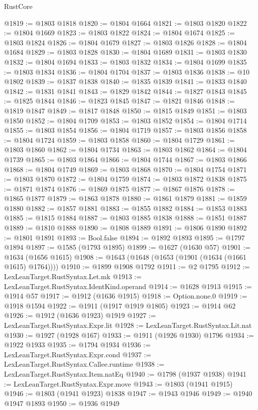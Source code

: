 \begin{lexlean}{RustCore}
\begin{coremodule}
@1819 := @1803 @1818
@1820 := @1804 @1664
@1821 := @1803 @1820
@1822 := @1804 @1669
@1823 := @1803 @1822
@1824 := @1804 @1674
@1825 := @1803 @1824
@1826 := @1804 @1679
@1827 := @1803 @1826
@1828 := @1804 @1684
@1829 := @1803 @1828
@1830 := @1804 @1689
@1831 := @1803 @1830
@1832 := @1804 @1694
@1833 := @1803 @1832
@1834 := @1804 @1699
@1835 := @1803 @1834
@1836 := @1804 @1704
@1837 := @1803 @1836
@1838 := @10 @1802
@1839 := @1837 @1838
@1840 := @1835 @1839
@1841 := @1833 @1840
@1842 := @1831 @1841
@1843 := @1829 @1842
@1844 := @1827 @1843
@1845 := @1825 @1844
@1846 := @1823 @1845
@1847 := @1821 @1846
@1848 := @1819 @1847
@1849 := @1817 @1848
@1850 := @1815 @1849
@1851 := @1803 @1850
@1852 := @1804 @1709
@1853 := @1803 @1852
@1854 := @1804 @1714
@1855 := @1803 @1854
@1856 := @1804 @1719
@1857 := @1803 @1856
@1858 := @1804 @1724
@1859 := @1803 @1858
@1860 := @1804 @1729
@1861 := @1803 @1860
@1862 := @1804 @1734
@1863 := @1803 @1862
@1864 := @1804 @1739
@1865 := @1803 @1864
@1866 := @1804 @1744
@1867 := @1803 @1866
@1868 := @1804 @1749
@1869 := @1803 @1868
@1870 := @1804 @1754
@1871 := @1803 @1870
@1872 := @1804 @1759
@1874 := @1803 @1872 @1838
@1875 := @1871 @1874
@1876 := @1869 @1875
@1877 := @1867 @1876
@1878 := @1865 @1877
@1879 := @1863 @1878
@1880 := @1861 @1879
@1881 := @1859 @1880
@1882 := @1857 @1881
@1883 := @1855 @1882
@1884 := @1853 @1883
@1885 := @1815 @1884
@1887 := @1803 @1885 @1838
@1888 := @1851 @1887
@1889 := @1810 @1888
@1890 := @1808 @1889
@1891 := @1806 @1890
@1892 := @1801 @1891
@1893 := Bool.false
@1894 := @1892 @1893
@1895 := @1797 @1894
@1897 := @1585 (@1793 @1895)
@1899 := @1627 (@1630 @57)
@1901 := @1634 (@1656 @1615)
@1908 := @1643 (@1648 (@1653 (@1901 (@1634 (@1661 @1615) @1764))))
@1910 := @1899 @1908 @1792
@1911 := @2 @1795
@1912 := LexLeanTarget.RustSyntax.Let.mk
@1913 := LexLeanTarget.RustSyntax.IdentKind.operand
@1914 := @1628 @1913
@1915 := @1914 @57
@1917 := @1912 (@1636 @1915)
@1918 := Option.none.{0}
@1919 := @1918 @1594
@1922 := @1911 (@1917 @1919 @1805)
@1923 := @1914 @62
@1926 := @1912 (@1636 @1923) @1919
@1927 := LexLeanTarget.RustSyntax.Expr.lit
@1928 := LexLeanTarget.RustSyntax.Lit.nat
@1930 := @1927 (@1928 @167)
@1933 := @1911 (@1926 @1930) @1796
@1934 := @1922 @1933
@1935 := @1794 @1934
@1936 := LexLeanTarget.RustSyntax.Expr.cond
@1937 := LexLeanTarget.RustSyntax.Callee.runtime
@1938 := LexLeanTarget.RustSyntax.Item.natEq
@1940 := @1798 (@1937 @1938)
@1941 := LexLeanTarget.RustSyntax.Expr.move
@1943 := @1803 (@1941 @1915)
@1946 := @1803 (@1941 @1923) @1838
@1947 := @1943 @1946
@1949 := @1940 @1947 @1893
@1950 := @1936 @1949

\end{coremodule}
\end{lexlean}
